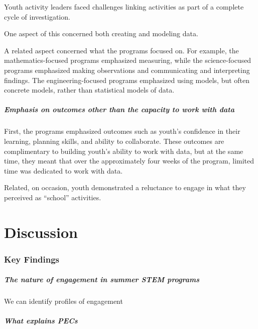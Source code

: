 \documentclass[]{book}
\let\oldparagraph\paragraph
\renewcommand{\paragraph}[1]{\oldparagraph{#1}\mbox{}}
\theoremstyle{definition}
\theoremstyle{definition}
\theoremstyle{definition}
\theoremstyle{remark}
\begin{document}
Youth activity leaders faced challenges linking activities as part of a
complete cycle of investigation.

One aspect of this concerned both creating and modeling data.

A related aspect concerned what the programs focused on. For example,
the mathematics-focused programs emphasized measuring, while the
science-focused programs emphasized making observations and
communicating and interpreting findings. The engineering-focused
programs emphasized using models, but often concrete models, rather than
statistical models of data.

\paragraph{Emphasis on outcomes other than the capacity to work with
data}\label{emphasis-on-outcomes-other-than-the-capacity-to-work-with-data}

First, the programs emphasized outcomes such as youth's confidence in
their learning, planning skills, and ability to collaborate. These
outcomes are complimentary to building youth's ability to work with
data, but at the same time, they meant that over the approximately four
weeks of the program, limited time was dedicated to work with data.

Related, on occasion, youth demonstrated a reluctance to engage in what
they perceived as ``school'' activities.

\chapter{Discussion}\label{discussion}

\subsection{Key Findings}\label{key-findings}

\paragraph{The nature of engagement in summer STEM
programs}\label{the-nature-of-engagement-in-summer-stem-programs}

We can identify profiles of engagement

\paragraph{What explains PECs}\label{what-explains-pecs}
\end{document}
